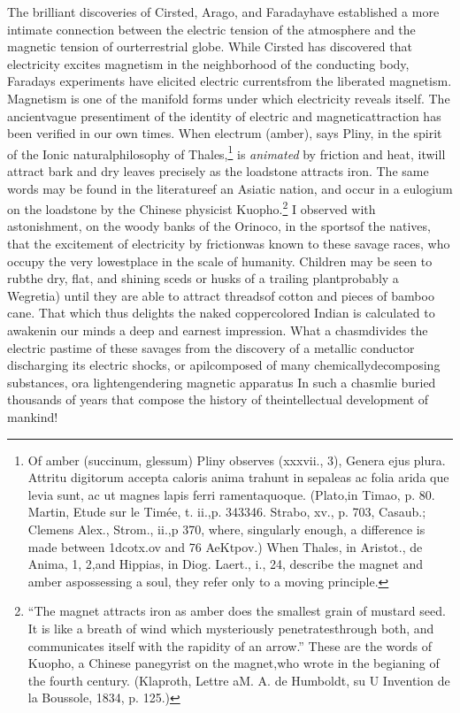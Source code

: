 The brilliant discoveries of Cirsted, Arago, and Faradayhave established a more intimate connection between the electric tension of the atmosphere and the magnetic tension of ourterrestrial globe. While Cirsted has discovered that electricity excites magnetism in the neighborhood of the conducting body, Faradays experiments have elicited electric currentsfrom the liberated magnetism. Magnetism is one of the manifold forms under which electricity reveals itself. The ancientvague presentiment of the identity of electric and magneticattraction has been verified in our own times.  When electrum (amber), says Pliny, in the spirit of the Ionic naturalphilosophy of Thales,\footnote{Of amber (succinum, glessum) Pliny observes (xxxvii., 3),  Genera ejus plura. Attritu digitorum accepta caloris anima trahunt in sepaleas ac folia arida que levia sunt, ac ut magnes lapis ferri ramentaquoque. (Plato,in Timao, p. 80. Martin, Etude sur le Tim\'{e}e, t. ii.,p. 343346. Strabo, xv., p. 703, Casaub.; Clemens Alex., Strom., ii.,p 370, where, singularly enough, a difference is made between 1dcotx.ov and 76 AeKtpov.) When Thales, in Aristot., de Anima, 1, 2,and Hippias, in Diog. Laert., i., 24, describe the magnet and amber aspossessing a soul, they refer only to a moving principle.} is \emph{animated} by friction and heat, itwill attract bark and dry leaves precisely as the loadstone attracts iron. The same words may be found in the literatureef an Asiatic nation, and occur in a eulogium on the loadstone by the Chinese physicist Kuopho.\footnote{``The magnet attracts iron as amber does the smallest grain of mustard seed. It is like a breath of wind which mysteriously penetratesthrough both, and communicates itself with the rapidity of an arrow.'' These are the words of Kuopho, a Chinese panegyrist on the magnet,who wrote in the begianing of the fourth century. (Klaproth, Lettre aM. A. de Humboldt, su U Invention de la Boussole, 1834, p. 125.)} I observed with astonishment, on the woody banks of the Orinoco, in the sportsof the natives, that the excitement of electricity by frictionwas known to these savage races, who occupy the very lowestplace in the scale of humanity. Children may be seen to rubthe dry, flat, and shining sceds or husks of a trailing plantprobably a Wegretia) until they are able to attract threadsof cotton and pieces of bamboo cane. That which thus delights the naked coppercolored Indian is calculated to awakenin our minds a deep and earnest impression. What a chasmdivides the electric pastime of these savages from the discovery of a metallic conductor discharging its electric shocks, or apilcomposed of many chemicallydecomposing substances, ora lightengendering magnetic apparatus In such a chasmlie buried thousands of years that compose the history of theintellectual development of mankind!

